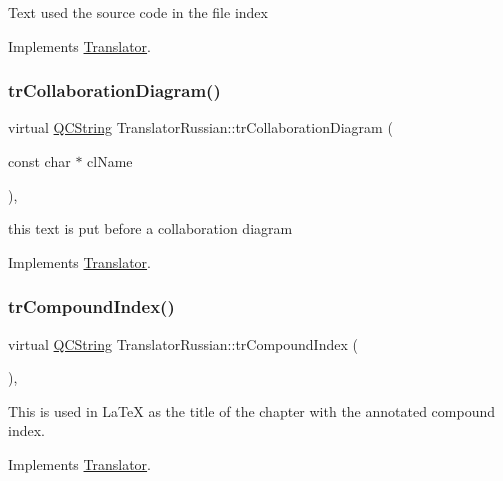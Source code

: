 Text used the source code in the file index 

Implements \mbox{\hyperlink{class_translator}{Translator}}.

\mbox{\label{class_translator_russian_a0f2eeecd1a70055e260b69e094ff6625}} 
\subsubsection{\texorpdfstring{trCollaborationDiagram()}{trCollaborationDiagram()}}
{\footnotesize\ttfamily virtual \mbox{\hyperlink{class_q_c_string}{Q\+C\+String}} Translator\+Russian\+::tr\+Collaboration\+Diagram (\begin{DoxyParamCaption}\item[{const char $\ast$}]{cl\+Name }\end{DoxyParamCaption})\hspace{0.3cm}{\ttfamily [inline]}, {\ttfamily [virtual]}}

this text is put before a collaboration diagram 

Implements \mbox{\hyperlink{class_translator}{Translator}}.

\mbox{\label{class_translator_russian_a1a47c4fdfba9c6e4f4d1ae17c52e38fc}} 
\subsubsection{\texorpdfstring{trCompoundIndex()}{trCompoundIndex()}}
{\footnotesize\ttfamily virtual \mbox{\hyperlink{class_q_c_string}{Q\+C\+String}} Translator\+Russian\+::tr\+Compound\+Index (\begin{DoxyParamCaption}{ }\end{DoxyParamCaption})\hspace{0.3cm}{\ttfamily [inline]}, {\ttfamily [virtual]}}

This is used in La\+TeX as the title of the chapter with the annotated compound index. 

Implements \mbox{\hyperlink{class_translator}{Translator}}.

\mbox{\label{class_translator_russian_a1c3c2e58035c8664cf01480ffc0e2209}} 
